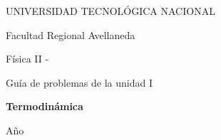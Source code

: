\begin{titlepage}
    \begin{center}
    \vspace{1.5cm}
    

    \end{center}

    \begin{center}
        {\LARGE UNIVERSIDAD TECNOLÓGICA NACIONAL}\par\medskip
        \vspace*{0.25cm}
        {\LARGE Facultad Regional Avellaneda}\par\medskip
        \vspace*{1cm}
        {\Huge Física II - \comision}\par\medskip
        \vspace*{0.5cm}
        {\LARGE Guía de problemas de la unidad I}\par\bigskip
        \vspace*{1cm}
        {\Huge \bf \color[RGB]{0,121,138} Termodinámica\par\medskip}
    \end{center}

    \vspace{1cm}

    \begin{center}
        \begin{minipage}[t]{.7\textwidth}
            \renewcommand*{\contentsname}{Contenidos}
            \tableofcontents
        \end{minipage}
        \vspace*{\fill}
    \end{center}
    \begin{center}
        Año \anio
    \end{center}

\end{titlepage}

\newpage
{}

